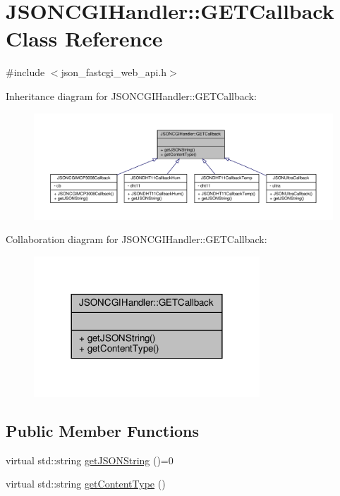 \hypertarget{classJSONCGIHandler_1_1GETCallback}{}\section{J\+S\+O\+N\+C\+G\+I\+Handler\+:\+:G\+E\+T\+Callback Class Reference}
\label{classJSONCGIHandler_1_1GETCallback}


{\ttfamily \#include $<$json\+\_\+fastcgi\+\_\+web\+\_\+api.\+h$>$}



Inheritance diagram for J\+S\+O\+N\+C\+G\+I\+Handler\+:\+:G\+E\+T\+Callback\+:
\nopagebreak
\begin{figure}[H]
\begin{center}
\leavevmode
\includegraphics[width=350pt]{classJSONCGIHandler_1_1GETCallback__inherit__graph}
\end{center}
\end{figure}


Collaboration diagram for J\+S\+O\+N\+C\+G\+I\+Handler\+:\+:G\+E\+T\+Callback\+:
\nopagebreak
\begin{figure}[H]
\begin{center}
\leavevmode
\includegraphics[width=240pt]{classJSONCGIHandler_1_1GETCallback__coll__graph}
\end{center}
\end{figure}
\subsection*{Public Member Functions}
\begin{DoxyCompactItemize}
\item 
virtual std\+::string \hyperlink{classJSONCGIHandler_1_1GETCallback_a2367bf5a5912e9e5599ee464e0846255}{get\+J\+S\+O\+N\+String} ()=0
\item 
virtual std\+::string \hyperlink{classJSONCGIHandler_1_1GETCallback_a4e1fee495ddeb4e24eaa5b8e767ea838}{get\+Content\+Type} ()
\end{DoxyCompactItemize}


